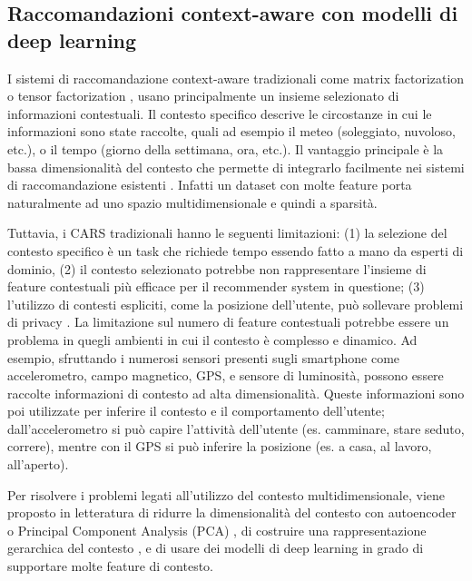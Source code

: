 \documentclass[12pt,italian]{report}
\begin{document}
\subsection{Raccomandazioni context-aware con modelli di deep learning}
I sistemi di raccomandazione context-aware tradizionali come matrix factorization \cite{mf-context-aware} o tensor factorization \cite{tensor-context-aware}, usano principalmente un insieme selezionato di informazioni contestuali. Il contesto specifico descrive le circostanze in cui le informazioni sono state raccolte, quali ad esempio il meteo (soleggiato, nuvoloso, etc.), o il tempo (giorno della settimana, ora, etc.). Il vantaggio principale è la bassa dimensionalità del contesto che permette di integrarlo facilmente nei sistemi di raccomandazione esistenti \cite{context-aware-deep-learning}. Infatti un dataset con molte feature porta naturalmente ad uno spazio multidimensionale e quindi a sparsità.

Tuttavia, i CARS tradizionali  hanno le seguenti limitazioni: (1) la selezione del contesto specifico è un task che richiede tempo essendo fatto a mano da esperti di dominio, (2) il contesto selezionato potrebbe non rappresentare l'insieme di feature contestuali più efficace per il recommender system in questione; (3) l'utilizzo di contesti espliciti, come la posizione dell'utente, può sollevare problemi di privacy  \cite{context-aware-deep-learning}. La limitazione sul numero di feature contestuali potrebbe essere un problema in quegli ambienti in cui il contesto è complesso e dinamico. Ad esempio, sfruttando i numerosi sensori presenti sugli smartphone come accelerometro, campo magnetico, GPS, e sensore di luminosità, possono essere raccolte informazioni di contesto ad alta dimensionalità. Queste informazioni sono poi utilizzate per inferire il contesto e il comportamento dell'utente; dall'accelerometro si può capire l'attività dell'utente (es. camminare, stare seduto, correre), mentre con il GPS si può inferire la posizione (es. a casa, al lavoro, all'aperto).

Per risolvere i problemi legati all'utilizzo del contesto multidimensionale, viene proposto in letteratura di ridurre la dimensionalità del contesto con autoencoder o Principal Component Analysis (PCA) \cite{latent-context} \cite{context-autoencoder}, di costruire una rappresentazione gerarchica del contesto \cite{hierarchical-context}, e di usare dei modelli di deep learning in grado di supportare molte feature di contesto\cite{context-aware-deep-learning}.
\end{document}
